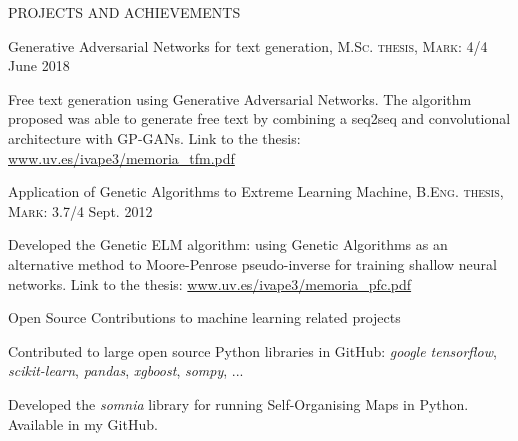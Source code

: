 \documentclass{resume} %
\begin{document}

\begin{rSection}{PROJECTS AND ACHIEVEMENTS}

\begin{rSubsection}{Generative Adversarial Networks for text generation, \textnormal{\textsc{M.Sc. thesis, Mark: 4/4}}}
{June 2018}{}{}  %

\vspace{-3pt}

\item Free text generation using Generative Adversarial Networks. The algorithm proposed was able to generate free text by combining a seq2seq and convolutional architecture with GP-GANs. Link to the thesis: \href{https://www.uv.es/ivape3/memoria_tfm.pdf}{www.uv.es/ivape3/memoria\_tfm.pdf}

\end{rSubsection}

\vspace{-6pt}

\begin{rSubsection}{Application of Genetic Algorithms to Extreme Learning Machine, \textnormal{\textsc{B.Eng. thesis, Mark: 3.7/4}}}
{Sept. 2012}{}{}  

\vspace{-3pt}

\item Developed the Genetic ELM algorithm: using Genetic Algorithms as an alternative method to Moore-Penrose pseudo-inverse for training shallow neural networks. Link to the thesis: \href{https://www.uv.es/ivape3/memoria_pfc.pdf}{www.uv.es/ivape3/memoria\_pfc.pdf}

\end{rSubsection}

\vspace{-6pt}

\begin{rSubsection}{Open Source Contributions to machine learning related projects}
{}{}{}  

\vspace{-3pt}

\item Contributed to large open source Python libraries in GitHub: \textit{google tensorflow}, \textit{scikit-learn}, \textit{pandas}, \textit{xgboost}, \textit{sompy}, ... 
\item Developed the \textit{somnia} library for running Self-Organising Maps in Python. Available in my GitHub.
\end{rSubsection}


\end{rSection}
\end{document}
